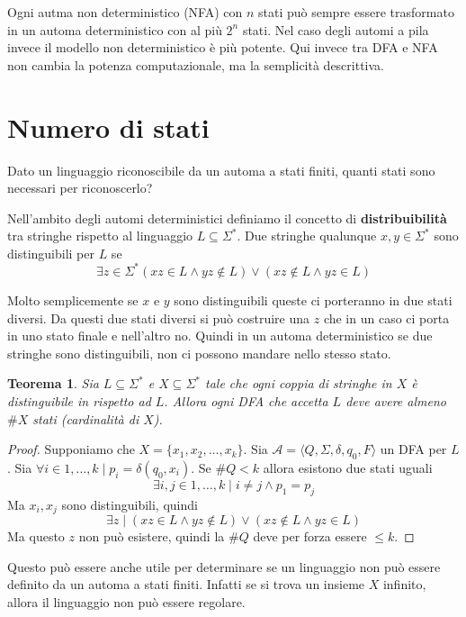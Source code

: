 \documentclass[12pt]{report}
\newtheorem{teorema}{Teorema}
\begin{document}
Ogni autma non deterministico (NFA) con $n$ stati può sempre essere trasformato in un automa deterministico con al più $2^n$ stati.
Nel caso degli automi a pila invece il modello non deterministico è più potente.
Qui invece tra DFA e NFA non cambia la potenza computazionale, ma la semplicità descrittiva.

\section{Numero di stati}
Dato un linguaggio riconoscibile da un automa a stati finiti, quanti stati sono necessari per riconoscerlo?

Nell'ambito degli automi deterministici definiamo il concetto di \textbf{distribuibilità} tra stringhe rispetto al linguaggio $L \subseteq \Sigma^*$.
Due stringhe qualunque $x, y \in \Sigma^*$ sono distinguibili per $L$ se 
$$ \exists z \in \Sigma^* (xz \in L \wedge yz \not \in L) \vee (xz \not \in L \wedge yz \in L) $$

Molto semplicemente se $x$ e $y$ sono distinguibili queste ci porteranno in due stati diversi.
Da questi due stati diversi si può costruire una $z$ che in un caso ci porta in uno stato finale e nell'altro no.
Quindi in un automa deterministico se due stringhe sono distinguibili, non ci possono mandare nello stesso stato.

\begin{teorema}
	Sia $L \subseteq \Sigma^*$ e $X \subseteq \Sigma^*$ tale che ogni coppia di stringhe in $X$ è distinguibile in rispetto ad $L$.
 	Allora ogni DFA che accetta $L$ deve avere almeno $\# X$ stati (cardinalità di $X$).
\end{teorema}
\begin{proof}
	Supponiamo che $X = \{x_1, x_2, \dots, x_k \}$.
	Sia $\mathcal{A} = \langle Q, \Sigma, \delta, q_0, F \rangle$ un DFA per $L$.
	Sia $\forall i \in 1, \dots, k \mid p_i = \delta(q_0, x_i)$.
	Se $\# Q < k$ allora esistono due stati uguali
	$$ \exists i, j \in 1, \dots, k \mid i \neq j \wedge p_1 = p_j $$
	Ma $x_i, x_j$ sono distinguibili, quindi
	$$ \exists z \mid (xz \in L \wedge yz \not \in L) \vee (xz \not \in L \wedge yz \in L) $$
	Ma questo $z$ non può esistere, quindi la $\# Q$ deve per forza essere $\leq k$.
\end{proof}
Questo può essere anche utile per determinare se un linguaggio non può essere definito da un automa a stati finiti.
Infatti se si trova un insieme $X$ infinito, allora il linguaggio non può essere regolare.
\end{document}
